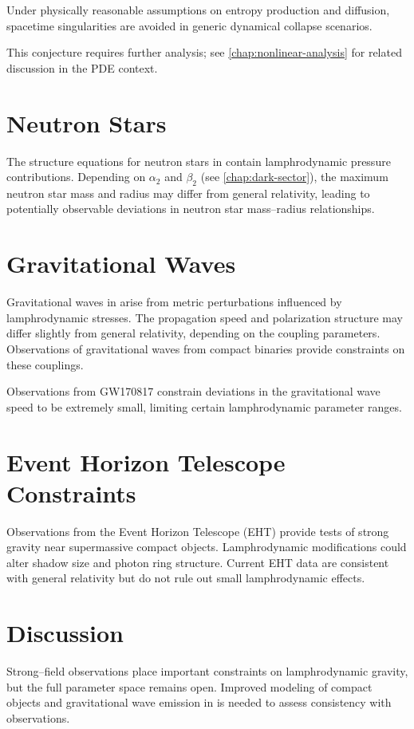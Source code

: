 \begin{conjecture}
\label{conj:no-singularity}
Under physically reasonable assumptions on entropy production and diffusion,
spacetime singularities are avoided in generic dynamical collapse scenarios.
\end{conjecture}

This conjecture requires further analysis; see \cref{chap:nonlinear-analysis}
for related discussion in the PDE context.

\section{Neutron Stars}

The structure equations for neutron stars in \rsvpabbr{} contain lamphrodynamic
pressure contributions. Depending on $\alpha_2$ and $\beta_2$ (see
\cref{chap:dark-sector}), the maximum neutron star mass and radius may differ
from general relativity, leading to potentially observable deviations in
neutron star mass--radius relationships.

\section{Gravitational Waves}

Gravitational waves in \rsvpabbr{} arise from metric perturbations influenced
by lamphrodynamic stresses. The propagation speed and polarization structure
may differ slightly from general relativity, depending on the coupling
parameters. Observations of gravitational waves from compact binaries provide
constraints on these couplings.

\begin{remark}
Observations from GW170817 constrain deviations in the gravitational wave
speed to be extremely small, limiting certain lamphrodynamic parameter
ranges.
\end{remark}

\section{Event Horizon Telescope Constraints}

Observations from the Event Horizon Telescope (EHT) provide tests of strong
gravity near supermassive compact objects. Lamphrodynamic modifications could
alter shadow size and photon ring structure. Current EHT data are consistent
with general relativity but do not rule out small lamphrodynamic effects.

\section{Discussion}

Strong--field observations place important constraints on lamphrodynamic
gravity, but the full parameter space remains open. Improved modeling of
compact objects and gravitational wave emission in \rsvpabbr{} is needed to
assess consistency with observations.

\clearpage
